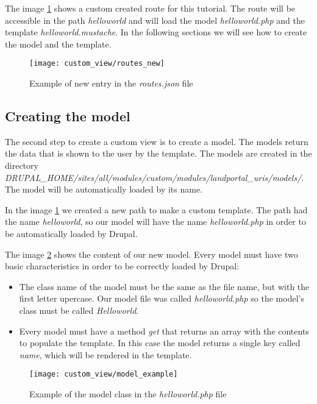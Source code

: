 The image \ref{fig:rutas_nueva} shows a custom created route for this tutorial.  The route will be accessible in the path \textit{helloworld} and will load the model \textit{helloworld.php} and the template \textit{helloworld.mustache}.  In the following sections we will see how to create the model and the template.
	\begin{figure}[h]
		\centering
		\texttt{[image: custom\_view/routes\_new]}
		\caption{Example of new entry in the \textit{routes.json} file}
		\label{fig:rutas_nueva}
	\end{figure}

\subsection{Creating the model}
	The second step to create a custom view is to create a model.  The models return the data that is shown to the user by the template.  The models are created in the directory \textit{DRUPAL\_HOME/sites/all/modules/custom/modules/landportal\_uris/models/}.  The model will be automatically loaded by its name.
	
	In the image \ref{fig:rutas_nueva} we created a new path to make a custom template.  The path had the name \textit{helloworld}, so our model will have the name \textit{helloworld.php} in order to be automatically loaded by Drupal.
	
	The image \ref{fig:rutas_modelo} shows the content of our new model.  Every model must have two basic characteristics in order to be correctly loaded by Drupal:
	\begin{itemize}
		\item
			The class name of the model must be the same as the file name, but with the first letter upercase.  Our model file was called \textit{helloworld.php} so the model's class must be called \textit{Helloworld}.
		\item
			Every model must have a method \textit{get} that returns an array with the contents to populate the template.  In this case the model returns a single key called \textit{name}, which will be rendered in the template.
	\end{itemize}
	
	\begin{figure}[h]
		\centering
		\texttt{[image: custom\_view/model\_example]}
		\caption{Example of the model class in the \textit{helloworld.php} file}
		\label{fig:rutas_modelo}
	\end{figure}

